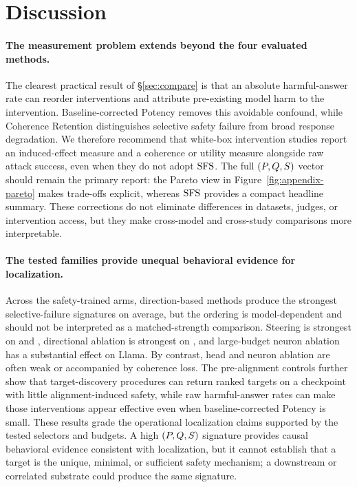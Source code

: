 \section{Discussion}
\label{sec:discussion}

\paragraph{The measurement problem extends beyond the four evaluated methods.}
The clearest practical result of \S\ref{sec:compare} is that an absolute
harmful-answer rate can reorder interventions and attribute pre-existing model
harm to the intervention. Baseline-corrected Potency removes this avoidable
confound, while Coherence Retention distinguishes selective safety failure from
broad response degradation. We therefore recommend that white-box intervention
studies report an induced-effect measure and a coherence or utility measure
alongside raw attack success, even when they do not adopt $\mathrm{SFS}$. The full
$(P,Q,S)$ vector should remain the primary report: the Pareto view
in Figure~\ref{fig:appendix-pareto} makes trade-offs explicit, whereas $\mathrm{SFS}$
provides a compact headline summary. These corrections do not eliminate
differences in datasets, judges, or intervention access, but they make
cross-model and cross-study comparisons more interpretable.

\paragraph{The tested families provide unequal behavioral evidence for localization.}
Across the safety-trained arms, direction-based methods produce the strongest
selective-failure signatures on average, but the ordering is model-dependent
and should not be interpreted as a matched-strength comparison. Steering is
strongest on  and , directional
ablation is strongest on , and large-budget neuron ablation has
a substantial effect on Llama. By contrast, head and neuron ablation are often
weak or accompanied by coherence loss. The pre-alignment controls further show
that target-discovery procedures can return ranked targets on a checkpoint with
little alignment-induced safety, while raw harmful-answer rates can make those
interventions appear effective even when baseline-corrected Potency is small.
These results grade the operational localization claims supported by the tested
selectors and budgets. A high $(P,Q,S)$ signature provides causal
behavioral evidence consistent with localization, but it cannot establish that
a target is the unique, minimal, or sufficient safety mechanism; a downstream
or correlated substrate could produce the same signature.

